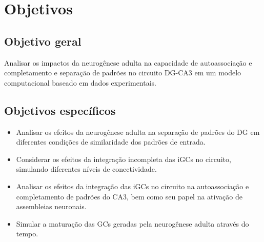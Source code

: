 \chapter{Objetivos}

\section{Objetivo geral}

Analisar os impactos da neurogênese adulta na capacidade de autoassociação e completamento e separação de padrões no circuito
DG-CA3 em um modelo computacional baseado em dados experimentais.

\section{Objetivos específicos}

\begin{itemize}
    \item Analisar os efeitos da neurogênese adulta na separação de padrões do DG em diferentes condições de similaridade dos
    padrões de entrada.
    \item Considerar os efeitos da integração incompleta das iGCs no circuito, simulando diferentes níveis de conectividade.
    \item Analisar os efeitos da integração das iGCs no circuito na autoassociação e completamento de padrões do CA3, bem como
    seu papel na ativação de assembleias neuronais.
    \item Simular a maturação das GCs geradas pela neurogênese adulta através do tempo.
\end{itemize}
